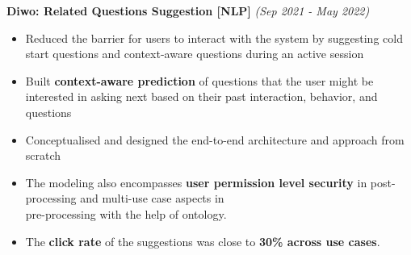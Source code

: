 \documentclass[a4paper,10pt]{article}
\newcommand{\isep}{-2 pt}
\begin{document}
\begin{itemize}
{{    
    
\item \textbf{Diwo: Related Questions Suggestion [NLP]} \hfill {\emph{(Sep 2021 - May 2022)}}
    \\[-0.6cm]
    \begin{itemize}\itemsep \isep
    	\item Reduced the barrier for users to interact with the system by suggesting cold start questions and context-aware questions during an active session 
        \item Built \textbf{context-aware prediction} of questions that the user might be interested in asking next based on their past interaction, behavior, and questions
        \item Conceptualised and designed the end-to-end architecture and approach from scratch 
        \item The modeling also encompasses \textbf{user permission level security} in post-processing and multi-use case aspects in \\ pre-processing with the help of ontology. 
        \item The \textbf{click rate} of the suggestions was close to \textbf{30\% across use cases}.
        \\ [-0.5cm]
    \end{itemize}


}}
\end{itemize}
\end{document}

